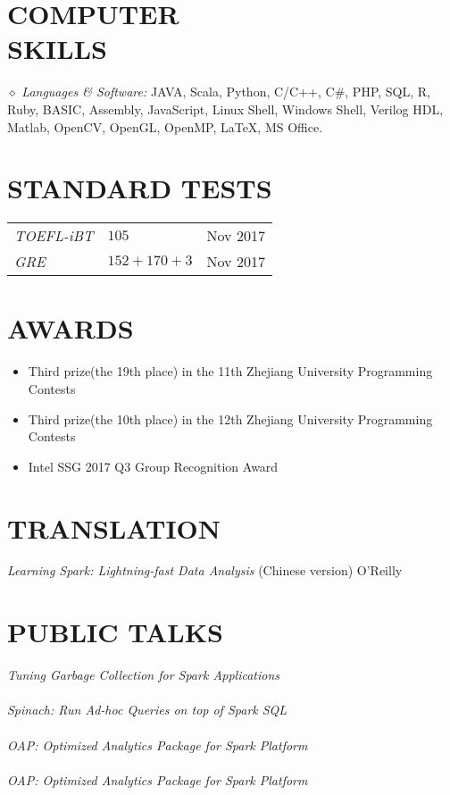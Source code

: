 \documentclass[line,margin]{res}
\begin{document}
\begin{resume}
\section{COMPUTER \\ SKILLS} {$\diamond$ \sl Languages \& Software:} JAVA, Scala, Python, C/C++, C\#, PHP, SQL, R, Ruby, BASIC, Assembly, JavaScript, Linux Shell, Windows Shell, Verilog HDL, Matlab, OpenCV, OpenGL, OpenMP, \LaTeX, MS Office. \\

\section{STANDARD TESTS}
\begin{tabular}{p{}p{}p{}}
\hline
{\sl TOEFL-iBT} &{$105$} &\hfill Nov 2017\\
{\sl GRE} &{$152+170+3$} &\hfill Nov 2017\\
\hline
\end{tabular}

\section{AWARDS}
    \begin{itemize}
            \item Third prize(the 19th place) in the 11th Zhejiang University Programming Contests
            \item Third prize(the 10th place) in the 12th Zhejiang University Programming Contests
            \item Intel SSG 2017 Q3 Group Recognition Award
    \end{itemize}

\section{TRANSLATION}
            {\sl Learning Spark: Lightning-fast Data Analysis} (Chinese version) \hfill O'Reilly

\section{PUBLIC TALKS}
            {\sl Tuning Garbage Collection for Spark Applications}\\
                \\
            {\sl Spinach: Run Ad-hoc Queries on top of Spark SQL}\\
                \\
            {\sl OAP: Optimized Analytics Package for Spark Platform}\\
                \\
            {\sl OAP: Optimized Analytics Package for Spark Platform}\\
                \\


\end{resume}
\end{document}
